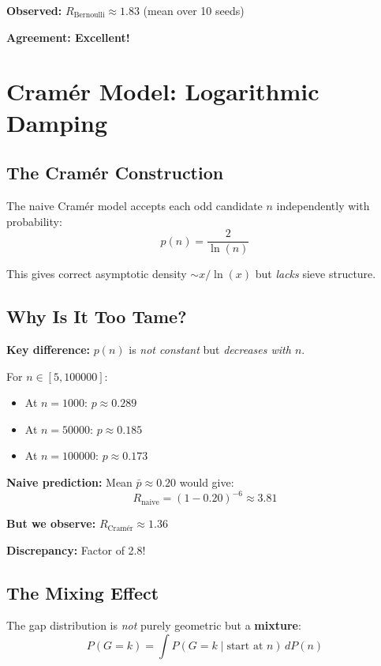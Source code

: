 \documentclass[11pt,a4paper]{article}
\theoremstyle{definition}
\theoremstyle{remark}
\begin{document}
\textbf{Observed:} $R_{\text{Bernoulli}} \approx 1.83$ (mean over 10 seeds)

\textbf{Agreement: Excellent!}

\section{Cramér Model: Logarithmic Damping}

\subsection{The Cramér Construction}

The naive Cramér model accepts each odd candidate $n$ independently with probability:
\begin{equation}
p(n) = \frac{2}{\ln(n)}
\end{equation}

This gives correct asymptotic density $\sim x/\ln(x)$ but \emph{lacks} sieve structure.

\subsection{Why Is It Too Tame?}

\textbf{Key difference:} $p(n)$ is \emph{not constant} but \emph{decreases with $n$}.

For $n \in [5, 100000]$:
\begin{itemize}
\item At $n=1000$: $p \approx 0.289$
\item At $n=50000$: $p \approx 0.185$
\item At $n=100000$: $p \approx 0.173$
\end{itemize}

\textbf{Naive prediction:} Mean $\bar{p} \approx 0.20$ would give:
\begin{equation}
R_{\text{naive}} = (1 - 0.20)^{-6} \approx 3.81
\end{equation}

\textbf{But we observe:} $R_{\text{Cramér}} \approx 1.36$

\textbf{Discrepancy:} Factor of 2.8!

\subsection{The Mixing Effect}

The gap distribution is \emph{not} purely geometric but a \textbf{mixture}:
\begin{equation}
P(G = k) = \int P(G = k \mid \text{start at } n) \, dP(n)
\end{equation}
\end{document}
